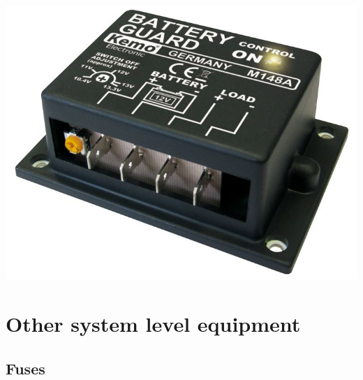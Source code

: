 \documentclass{article}
\theoremstyle{definition}
\theoremstyle{definition}
\theoremstyle{remark}
\begin{document}
  \begin{center}
    \includegraphics[width=0.15\paperwidth]{../Images/image_7_1_(discharge_control).png}
  \end{center}


\section{Other system level equipment} %
\label{sec:other_system_level_equipment}

  \subsection{Fuses} %
  \label{sub:fuses}
\end{document}

